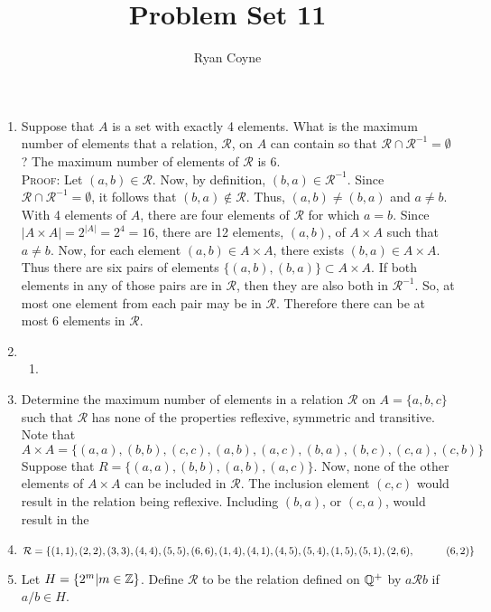 \documentclass[12pt]{article}
\newcommand{\mc}[1]{\mathcal{#1}}
\begin{document}
    \title{Problem Set 11}
    \author{Ryan Coyne}
    \maketitle

    \begin{enumerate}
        \item Suppose that \(A\) is a set with exactly 4 elements. What is the maximum number of elements that a relation, \(\mathcal{R}\), on \(A\) can contain so that \(\mathcal{R} \cap \mathcal{R}^{-1} = \emptyset\)? The maximum number of elements of \(\mathcal{R}\) is 6.\\ \textsc{Proof:} Let \((a,b)\in \mc{R}\). Now, by definition, \((b,a) \in \mc{R}^{-1}\). Since \(\mc{R}\cap\mc{R}^{-1}=\emptyset\), it follows that \((b,a)\not\in\mc R\). Thus, \((a,b)\neq(b,a)\) and \(a\neq b\). With 4 elements of \(A\), there are four elements of \(\mc R\) for which \(a=b\). Since \(|A\times A| = 2^{|A|} = 2^4 = 16\), there are 12 elements, \((a,b)\), of \(A\times A\) such that \(a \neq b\).  Now, for each element \((a,b)\in A\times A\), there exists \((b,a)\in A\times A\). Thus there are six pairs of elements \(\{(a,b), (b,a)\}\subset A\times A\). If both elements in any of those pairs are in \(\mc R\), then they are also both in \(\mc R^{-1}\). So, at most one element from each pair may be in \(\mc R\). Therefore there can be at most 6 elements in \(\mc R\).
        \item \begin{enumerate}
            \item 
        \end{enumerate}
        \item Determine the maximum number of elements in a relation \(\mc R\) on \(A = \{a, b, c\}\) such that \(\mc R\) has none of the properties reflexive, symmetric and transitive. Note that \(A \times A  = \{(a, a), (b,b), (c,c), (a,b), (a,c), (b, a), (b,c), (c, a), (c,b)\}\) Suppose that \(R = \{(a, a), (b,b), (a,b), (a,c)\}\). Now, none of the other elements of \(A\times A\) can be included in \(\mc R\). The inclusion element \((c,c)\) would result in the relation being reflexive. Including \((b,a)\), or \((c, a)\), would result in the 
        \item \(\mc R = \{(1,1), (2,2), (3,3), (4,4), (5,5), (6,6), (1,4), (4,1), (4,5), (5,4), (1,5), (5,1), (2,6),\\ ~~~~~~~~~ (6,2)\}\)
        \item Let \(H = \{2^m|m \in \mathbb{Z}\}\). Define \(\mc R\) to be the relation defined on \(\mathbb{Q}^+\) by \(a \mc R b\) if \(a/b \in H\). \begin{enumerate}

\end{enumerate}
\end{enumerate}
\end{document}
